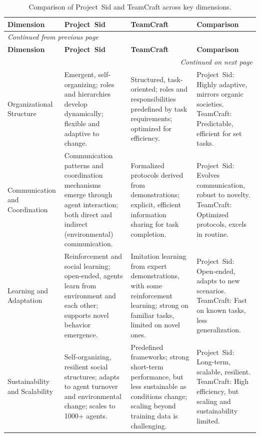 \documentclass[a4paper, 12pt]{article}
\begin{document}
\begin{landscape}
\begin{longtable}{p{3.5cm} p{6.5cm} p{6.5cm} p{6.5cm}}
    \caption{Comparison of Project~Sid and TeamCraft across key dimensions.} \label{tab:comparativeoverview} \\
    \toprule
    \textbf{Dimension} & \textbf{Project~Sid} & \textbf{TeamCraft} & \textbf{Comparison} \\
    \midrule
    \endfirsthead
    \multicolumn{4}{l}{\textit{Continued from previous page}} \\
    \toprule
    \textbf{Dimension} & \textbf{Project~Sid} & \textbf{TeamCraft} & \textbf{Comparison} \\
    \midrule
    \endhead
    \midrule
    \multicolumn{4}{r}{\textit{Continued on next page}} \\
    \endfoot
    \bottomrule
    \endlastfoot

    Organizational Structure & Emergent, self-organizing; roles and hierarchies develop dynamically; flexible and adaptive to change. & Structured, task-oriented; roles and responsibilities predefined by task requirements; optimized for efficiency. & Project~Sid: Highly adaptive, mirrors organic societies. \newline TeamCraft: Predictable, efficient for set tasks. \\
    Communication and \newline Coordination & Communication patterns and coordination mechanisms emerge through agent interaction; both direct and indirect (environmental) communication. & Formalized protocols derived from demonstrations; explicit, efficient information sharing for task completion. & Project~Sid: Evolves communication, robust to novelty. \newline TeamCraft: Optimized protocols, excels in routine. \\
    Learning and \newline Adaptation & Reinforcement and social learning; open-ended, agents learn from environment and each other; supports novel behavior emergence. & Imitation learning from expert demonstrations, with some reinforcement learning; strong on familiar tasks, limited on novel ones. & Project~Sid: Open-ended, adapts to new scenarios. \newline TeamCraft: Fast on known tasks, less generalization. \\
    Sustainability and \newline Scalability & Self-organizing, resilient social structures; adapts to agent turnover and environmental change; scales to 1000+ agents. & Predefined frameworks; strong short-term performance, but less sustainable as conditions change; scaling beyond training data is challenging. & Project~Sid: Long-term, scalable, resilient. \newline TeamCraft: High efficiency, but scaling and sustainability limited. \\
\end{longtable}
\end{landscape}
\end{document}

